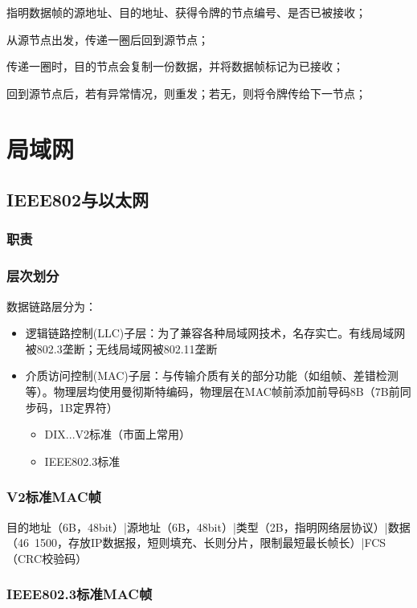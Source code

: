 指明数据帧的源地址、目的地址、获得令牌的节点编号、是否已被接收；

从源节点出发，传递一圈后回到源节点；

传递一圈时，目的节点会复制一份数据，并将数据帧标记为已接收；

回到源节点后，若有异常情况，则重发；若无，则将令牌传给下一节点；


\section{局域网}

\subsection{IEEE802与以太网}

\subsubsection{职责}

\subsubsection{层次划分}
数据链路层分为：\begin{itemize}
    \item 逻辑链路控制(LLC)子层：为了兼容各种局域网技术，名存实亡。有线局域网被802.3垄断；无线局域网被802.11垄断
    \item 介质访问控制(MAC)子层：与传输介质有关的部分功能（如组帧、差错检测等）。物理层均使用曼彻斯特编码，物理层在MAC帧前添加前导码8B（7B前同步码，1B定界符）
    \begin{itemize}
        \item DIX...V2标准（市面上常用）
        \item IEEE802.3标准
    \end{itemize}
\end{itemize}


\subsubsection{V2标准MAC帧}
目的地址（6B，48bit）|源地址（6B，48bit）|类型（2B，指明网络层协议）|数据（46~1500，存放IP数据报，短则填充、长则分片，限制最短最长帧长）|FCS（CRC校验码）


\subsubsection{IEEE802.3标准MAC帧}


